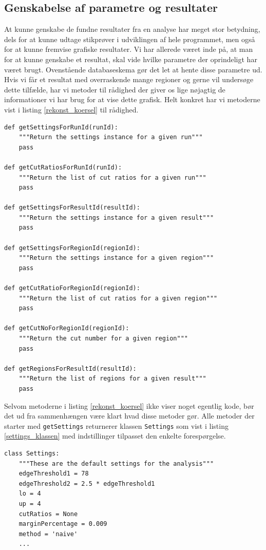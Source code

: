 {\subsection{Genskabelse af parametre og resultater}
At kunne genskabe de fundne resultater fra en analyse har meget stor
betydning, dels for at kunne udtage stikprøver i udviklingen af hele
programmet, men også for at kunne fremvise grafiske resultater. Vi har
allerede været inde på, at man for at kunne genskabe et resultat, skal
vide hvilke parametre der oprindeligt har været brugt. Ovenstående
databaseskema gør det let at hente disse parametre ud. Hvis vi får et
resultat med overraskende mange regioner og gerne vil undersøge dette
tilfælde, har vi metoder til rådighed der giver os lige nøjagtig de
informationer vi har brug for at vise dette grafisk. Helt konkret har vi
metoderne vist i listing \ref{rekonst_koersel} til rådighed.

\vspace{0.5cm}
\begin{lstlisting}[caption={Metoder til rekonstruktion af kørsler},captionpos=b,label={rekonst_koersel},numbers=none]
def getSettingsForRunId(runId):
    """Return the settings instance for a given run"""
    pass

def getCutRatiosForRunId(runId):
    """Return the list of cut ratios for a given run"""
    pass

def getSettingsForResultId(resultId):
    """Return the settings instance for a given result"""
    pass

def getSettingsForRegionId(regionId):
    """Return the settings instance for a given region"""
    pass

def getCutRatioForRegionId(regionId):
    """Return the list of cut ratios for a given region"""
    pass

def getCutNoForRegionId(regionId):
    """Return the cut number for a given region"""
    pass

def getRegionsForResultId(resultId):
    """Return the list of regions for a given result"""
    pass
\end{lstlisting}

Selvom metoderne i listing \ref{rekonst_koersel} ikke viser noget
egentlig kode, bør det ud fra sammenhængen være klart hvad disse metoder
gør. Alle metoder der starter med \texttt{getSettings} returnerer
klassen \texttt{Settings} som vist i listing \ref{settings_klassen} med
indstillinger tilpasset den enkelte forespørgelse.
\vspace{0.5cm}
\begin{lstlisting}[caption={Settings-klassen med standardindstillinger},captionpos=b,label={settings_klassen},numbers=none]
class Settings:
    """These are the default settings for the analysis"""
    edgeThreshold1 = 78
    edgeThreshold2 = 2.5 * edgeThreshold1
    lo = 4
    up = 4
    cutRatios = None
    marginPercentage = 0.009
    method = 'naive'
    ...
\end{lstlisting}

}

